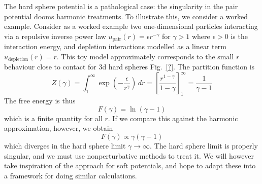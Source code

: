 \documentclass[11pt,twoside]{report}
\begin{document}
The hard sphere potential is a pathological case: the singularity in the pair potential dooms harmonic treatments.
To illustrate this, we consider a worked example.
Consider as a worked example two one-dimensional particles interacting via a repulsive inverse power law $u_{\textrm{pair}}(r) = \epsilon r^{-\gamma}$ for $\gamma > 1$ where $\epsilon > 0$ is the interaction energy, and depletion interactions modelled as a linear term $u_{\textrm{depletion}}(r) = r$.
This toy model approximately corresponds to the small $r$ behaviour close to contact for 3d hard spheres Fig.\ \ref{?}.
The partition function is
\begin{equation}
  Z(\gamma)
  = \int_1^{\infty} \exp{\left(-\frac{\epsilon}{r^\gamma}\right)} \, dr
  = \left[ \frac{r^{1-\gamma}}{1-\gamma} \right]_1^\infty
  = \frac{1}{\gamma - 1}
\end{equation}
The free energy is thus
\begin{equation}
  F(\gamma) = \ln{(\gamma - 1)}
\end{equation}
which is a finite quantity for all $r$.
If we compare this against the harmonic approximation, however, we obtain
\begin{equation}
  F(\gamma) \propto \gamma(\gamma - 1)
\end{equation}
which diverges in the hard sphere limit $\gamma \to \infty$.
The hard sphere limit is properly singular, and we must use nonperturbative methods to treat it.
We will however take inspiration of the approach for soft potentials, and hope to adapt these into a framework for doing similar calculations.
\end{document}
